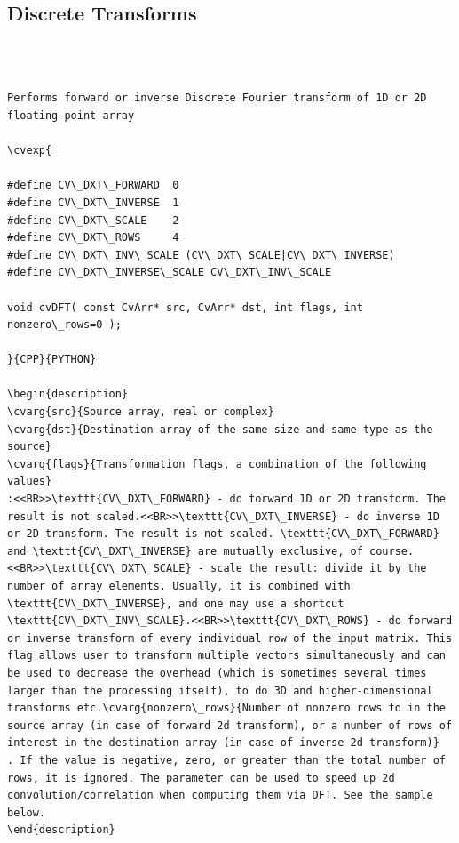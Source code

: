 \subsection{Discrete Transforms}
\begin{verbatim}


\end{verbatim}
\label{DFT}
\begin{verbatim}

Performs forward or inverse Discrete Fourier transform of 1D or 2D floating-point array

\cvexp{

#define CV\_DXT\_FORWARD  0
#define CV\_DXT\_INVERSE  1
#define CV\_DXT\_SCALE    2
#define CV\_DXT\_ROWS     4
#define CV\_DXT\_INV\_SCALE (CV\_DXT\_SCALE|CV\_DXT\_INVERSE)
#define CV\_DXT\_INVERSE\_SCALE CV\_DXT\_INV\_SCALE

void cvDFT( const CvArr* src, CvArr* dst, int flags, int nonzero\_rows=0 );

}{CPP}{PYTHON}

\begin{description}
\cvarg{src}{Source array, real or complex}
\cvarg{dst}{Destination array of the same size and same type as the source}
\cvarg{flags}{Transformation flags, a combination of the following values}
:<<BR>>\texttt{CV\_DXT\_FORWARD} - do forward 1D or 2D transform. The result is not scaled.<<BR>>\texttt{CV\_DXT\_INVERSE} - do inverse 1D or 2D transform. The result is not scaled. \texttt{CV\_DXT\_FORWARD} and \texttt{CV\_DXT\_INVERSE} are mutually exclusive, of course.<<BR>>\texttt{CV\_DXT\_SCALE} - scale the result: divide it by the number of array elements. Usually, it is combined with \texttt{CV\_DXT\_INVERSE}, and one may use a shortcut \texttt{CV\_DXT\_INV\_SCALE}.<<BR>>\texttt{CV\_DXT\_ROWS} - do forward or inverse transform of every individual row of the input matrix. This flag allows user to transform multiple vectors simultaneously and can be used to decrease the overhead (which is sometimes several times larger than the processing itself), to do 3D and higher-dimensional transforms etc.\cvarg{nonzero\_rows}{Number of nonzero rows to in the source array (in case of forward 2d transform), or a number of rows of interest in the destination array (in case of inverse 2d transform)}
. If the value is negative, zero, or greater than the total number of rows, it is ignored. The parameter can be used to speed up 2d convolution/correlation when computing them via DFT. See the sample below.
\end{description}


\end{verbatim}
